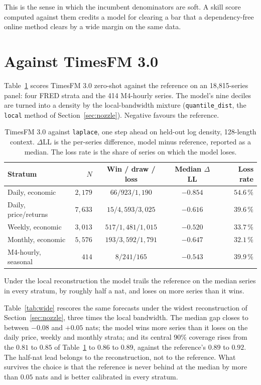 \documentclass[article]{jss}
\providecommand{\proglang}[1]{\textsf{#1}}
\providecommand{\code}[1]{\texttt{#1}}
\begin{document}
This is the sense in which the incumbent denominators are soft. A skill score
computed against them credits a model for clearing a bar that a dependency-free
online method clears by a wide margin on the same data.

\section{Against TimesFM 3.0}\label{sec:results}

Table~\ref{tab:raw} scores TimesFM 3.0 \citep{das2024timesfm} zero-shot against
the reference on an 18{,}815-series panel: four \proglang{FRED} strata and the
414 M4-hourly series. The model's nine deciles are turned into a density by the
local-bandwidth mixture (\code{quantile\_dist}, the \code{local} method of
Section~\ref{sec:nozzle}). Negative favours the reference.

\begin{table}[t!]
\centering
\begin{tabular}{lrccr}
\toprule
Stratum & $N$ & Win / draw / loss & Median $\Delta$LL & Loss rate \\
\midrule
Daily, economic       & $2{,}179$ & $66 / 923 / 1{,}190$      & $-0.854$ & $54.6\,\%$ \\
Daily, price/returns  & $7{,}633$ & $15 / 4{,}593 / 3{,}025$  & $-0.616$ & $39.6\,\%$ \\
Weekly, economic      & $3{,}013$ & $517 / 1{,}481 / 1{,}015$ & $-0.520$ & $33.7\,\%$ \\
Monthly, economic     & $5{,}576$ & $193 / 3{,}592 / 1{,}791$ & $-0.647$ & $32.1\,\%$ \\
M4-hourly, seasonal   & $414$     & $8 / 241 / 165$           & $-0.543$ & $39.9\,\%$ \\
\bottomrule
\end{tabular}
\caption{TimesFM 3.0 against \code{laplace}, one step ahead on held-out log
density, 128-length context. $\Delta$LL is the per-series difference, model
minus reference, reported as a median. The loss rate is the share of series on
which the model loses.}
\label{tab:raw}
\end{table}

Under the local reconstruction the model trails the reference on the median
series in every stratum, by roughly half a nat, and loses on more series than
it wins.

Table~\ref{tab:wide} rescores the same forecasts under the widest
reconstruction of Section~\ref{sec:nozzle}, three times the local bandwidth.
The median gap closes to between $-0.08$ and $+0.05$ nats; the model wins more
series than it loses on the daily price, weekly and monthly strata; and its
central 90\%
coverage rises from the $0.81$ to $0.85$ of Table~\ref{tab:raw} to $0.86$ to
$0.89$, against the reference's $0.89$ to $0.92$. The half-nat lead belongs to
the reconstruction, not to the reference. What survives the choice is that the
reference is never behind at the median by more than $0.05$ nats and is better
calibrated in every stratum.
\end{document}
